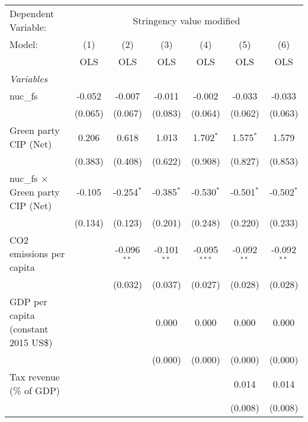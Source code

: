 
\begingroup
\centering
\begin{tabular}{lcccccc}
   \toprule
   Dependent Variable: & \multicolumn{6}{c}{Stringency value modified}\\
   Model:                                   & (1)     & (2)           & (3)           & (4)            & (5)           & (6)\\  
                                            &  OLS    & OLS           & OLS           & OLS            & OLS           & OLS\\  
   \midrule
   \emph{Variables}\\
   nuc\_fs                                  & -0.052  & -0.007        & -0.011        & -0.002         & -0.033        & -0.033\\   
                                            & (0.065) & (0.067)       & (0.083)       & (0.064)        & (0.062)       & (0.063)\\   
   Green party CIP (Net)                    & 0.206   & 0.618         & 1.013         & 1.702$^{*}$    & 1.575$^{*}$   & 1.579\\   
                                            & (0.383) & (0.408)       & (0.622)       & (0.908)        & (0.827)       & (0.853)\\   
   nuc\_fs $\times$ Green party CIP (Net)   & -0.105  & -0.254$^{*}$  & -0.385$^{*}$  & -0.530$^{*}$   & -0.501$^{*}$  & -0.502$^{*}$\\   
                                            & (0.134) & (0.123)       & (0.201)       & (0.248)        & (0.220)       & (0.233)\\   
   CO2 emissions per capita                 &         & -0.096$^{**}$ & -0.101$^{**}$ & -0.095$^{***}$ & -0.092$^{**}$ & -0.092$^{**}$\\   
                                            &         & (0.032)       & (0.037)       & (0.027)        & (0.028)       & (0.028)\\   
   GDP per capita (constant 2015 US\$)      &         &               & 0.000         & 0.000          & 0.000         & 0.000\\   
                                            &         &               & (0.000)       & (0.000)        & (0.000)       & (0.000)\\   
   Tax revenue (\% of GDP)                  &         &               &               &                & 0.014         & 0.014\\   
                                            &         &               &               &                & (0.008)       & (0.008)\\   

\end{tabular}
